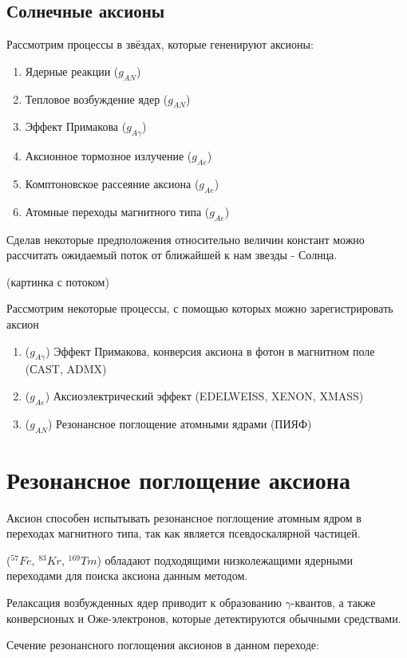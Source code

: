 \documentclass[a4paper,article,14pt]{extarticle}
\begin{document}
\subsection{Солнечные аксионы}

Рассмотрим процессы в звёздах, которые гененируют аксионы:
\begin{enumerate}
    \item Ядерные реакции ($g_{AN}$)
    \item Тепловое возбуждение ядер ($g_{AN}$)
    \item Эффект Примакова ($g_{A\gamma}$)
    \item Аксионное тормозное излучение ($g_{Ae}$)
    \item Комптоновское рассеяние аксиона ($g_{Ae}$)
    \item Атомные переходы магнитного типа ($g_{Ae}$)
\end{enumerate}

Сделав некоторые предположения относительно величин констант можно рассчитать ожидаемый поток от ближайшей к нам звезды - Солнца.

(картинка с потоком)

Рассмотрим некоторые процессы, с помощью которых можно зарегистрировать аксион
\begin{enumerate}
    \item ($g_{A\gamma}$) Эффект Примакова, конверсия аксиона в фотон в магнитном поле (СAST, ADMX)
    \item ($g_{Ae}$) Аксиоэлектрический эффект (EDELWEISS, XENON, XMASS)
    \item ($g_{AN}$) Резонансное поглощение атомными ядрами (ПИЯФ)
\end{enumerate}

\section{Резонансное поглощение аксиона}
Аксион способен испытывать резонансное поглощение атомным ядром в переходах магнитного типа, так как является псевдоскалярной частицей.

($^{57}Fe$, $^{83}Kr$, $^{169}Tm$) обладают подходящими низколежащими ядерными переходами для поиска аксиона данным методом.

Релаксация возбужденных ядер приводит к образованию $\gamma$-квантов, а также конверсионых и Оже-электронов, которые детектируются обычными средствами.

Сечение резонансного поглощения аксионов в данном переходе:
\end{document}
